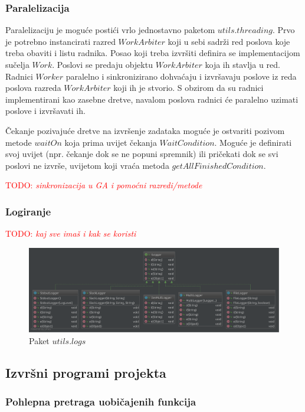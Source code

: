 \documentclass[times, utf8, numeric, diplomski]{fer}
\def\TODO#1{\noindent\textcolor{red}{TODO: \textit{#1}}\newline}
\def\todo#1{\TODO{#1}}
\begin{document}
\subsubsection{Paralelizacija}
Paralelizaciju je moguće postići vrlo jednostavno paketom $utils.threading$. Prvo je potrebno instancirati razred $WorkArbiter$ koji u sebi sadrži red poslova koje treba obaviti i listu radnika. Posao koji treba izvršiti definira se implementacijom sučelja $Work$. Poslovi se predaju objektu $WorkArbiter$ koja ih stavlja u red. Radnici $Worker$ paralelno i sinkronizirano dohvaćaju i izvršavaju poslove iz reda poslova razreda $WorkArbiter$ koji ih je stvorio. S obzirom da su radnici implementirani kao zasebne dretve, navalom poslova radnici će paralelno uzimati poslove i izvršavati ih.

Čekanje pozivajuće dretve na izvršenje zadataka moguće je ostvariti pozivom metode $waitOn$ koja prima uvijet čekanja $WaitCondition$. Moguće je definirati svoj uvijet (npr. čekanje dok se ne popuni spremnik) ili pričekati dok se svi poslovi ne izvrše, uvijetom koji vraća metoda $getAllFinishedCondition$.

\todo{sinkronizacija u GA i pomoćni razredi/metode}

\subsubsection{Logiranje}
\todo{kaj sve imaš i kak se koristi}

\begin{figure}[ht]
\includegraphics[width=\textwidth]{pkg_logs.pdf}
\centering
\caption{Paket $utils.logs$}
\label{fig:pkg_logs}
\end{figure}

\subsection{Izvršni programi projekta}
\subsubsection{Pohlepna pretraga uobičajenih funkcija}
\end{document}

